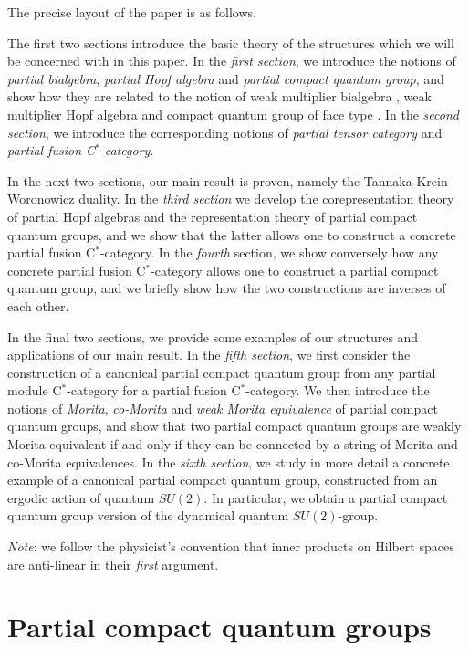 \documentclass[10pt]{article}
\theoremstyle{definition}
\numberwithin{equation}{section}
\begin{document}
The precise layout of the paper is as follows.

The first two sections introduce the basic theory of the structures which we will be concerned with in this paper. In the \emph{first section}, we introduce the notions of \emph{partial bialgebra}, \emph{partial Hopf algebra} and \emph{partial compact quantum group}, and show how they are related to the notion of weak multiplier bialgebra \cite{Boh1}, weak multiplier Hopf algebra \cite{VDW1,VDW2} and compact quantum group of face type \cite{Hay1}. In the \emph{second section}, we introduce the corresponding notions of \emph{partial tensor category} and \emph{partial fusion C$^*$-category}. 

In the next two sections, our main result is proven, namely the Tannaka-Krein-Woronowicz duality. In the \emph{third section} we develop the corepresentation theory of partial Hopf algebras and the representation theory of partial compact quantum groups, and we show that the latter allows one to construct a concrete partial fusion C$^*$-category. In the \emph{fourth} section, we show conversely how any concrete partial fusion C$^*$-category allows one to construct a partial compact quantum group, and we briefly show how the two constructions are inverses of each other.

In the final two sections, we provide some examples of our structures and applications of our main result. In the \emph{fifth section}, we first consider the construction of a canonical partial compact quantum group from any partial module C$^*$-category for a partial fusion C$^*$-category. We then introduce the notions of \emph{Morita}, \emph{co-Morita} and \emph{weak Morita equivalence} \cite{Mug1} of partial compact quantum groups, and show that two partial compact quantum groups are weakly Morita equivalent if and only if they can be connected by a string of Morita and co-Morita equivalences. In the \emph{sixth section}, we study in more detail a concrete example of a canonical partial compact quantum group, constructed from an ergodic action of quantum $SU(2)$. In particular, we obtain a partial compact quantum group version of the dynamical quantum $SU(2)$-group. 

\emph{Note}: we follow the physicist's convention that inner products on Hilbert spaces are anti-linear in their \emph{first} argument. 


\section{Partial compact quantum groups}
\end{document}
